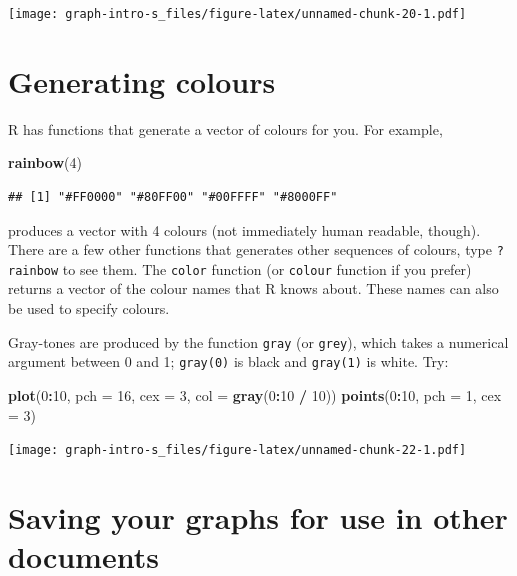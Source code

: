 \documentclass[
]{book}
\newenvironment{Shaded}{\begin{snugshade}}{\end{snugshade}}
\newcommand{\AttributeTok}[1]{\textcolor[rgb]{0.13,0.29,0.53}{#1}}
\newcommand{\DecValTok}[1]{\textcolor[rgb]{0.00,0.00,0.81}{#1}}
\newcommand{\FunctionTok}[1]{\textcolor[rgb]{0.13,0.29,0.53}{\textbf{#1}}}
\newcommand{\NormalTok}[1]{#1}
\newcommand{\SpecialCharTok}[1]{\textcolor[rgb]{0.81,0.36,0.00}{\textbf{#1}}}
\begin{document}
\texttt{[image: graph-intro-s\_files/figure-latex/unnamed-chunk-20-1.pdf]}

\section{Generating colours}\label{generating-colours}

R has functions that generate a vector of colours for you. For example,

\begin{Shaded}
\begin{Highlighting}[]
\FunctionTok{rainbow}\NormalTok{(}\DecValTok{4}\NormalTok{)}
\end{Highlighting}
\end{Shaded}

\begin{verbatim}
## [1] "#FF0000" "#80FF00" "#00FFFF" "#8000FF"
\end{verbatim}

produces a vector with 4 colours (not immediately human readable,
though). There are a few other functions that generates other
sequences of colours, type \texttt{?rainbow} to see them. The
\texttt{color} function (or \texttt{colour} function if you prefer)
returns a vector of the colour names that R knows about. These
names can also be used to specify colours.

Gray-tones are produced by the function \texttt{gray} (or
\texttt{grey}), which takes a numerical argument between 0 and 1;
\texttt{gray(0)} is black and \texttt{gray(1)} is white. Try:

\begin{Shaded}
\begin{Highlighting}[]
\FunctionTok{plot}\NormalTok{(}\DecValTok{0}\SpecialCharTok{:}\DecValTok{10}\NormalTok{, }\AttributeTok{pch =} \DecValTok{16}\NormalTok{, }\AttributeTok{cex =} \DecValTok{3}\NormalTok{, }\AttributeTok{col =} \FunctionTok{gray}\NormalTok{(}\DecValTok{0}\SpecialCharTok{:}\DecValTok{10} \SpecialCharTok{/} \DecValTok{10}\NormalTok{))}
\FunctionTok{points}\NormalTok{(}\DecValTok{0}\SpecialCharTok{:}\DecValTok{10}\NormalTok{, }\AttributeTok{pch =} \DecValTok{1}\NormalTok{, }\AttributeTok{cex =} \DecValTok{3}\NormalTok{)}
\end{Highlighting}
\end{Shaded}

\texttt{[image: graph-intro-s\_files/figure-latex/unnamed-chunk-22-1.pdf]}

\section{Saving your graphs for use in other documents}\label{saving-your-graphs-for-use-in-other-documents}
\end{document}
